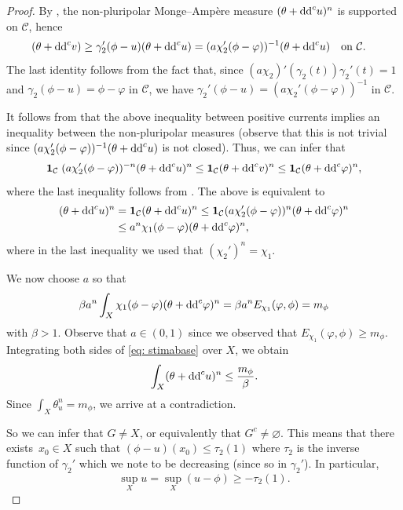 \documentclass[11pt]{article}
\numberwithin{equation}{section}
\numberwithin{equation}{section}
\theoremstyle{plain}
\newcommand{\f}{\varphi}
\begin{document}
\begin{proof}
By \cite[Theorem 2.7]{DDL6}, the non-pluripolar Monge--Amp\`ere measure $(\theta+{\rm dd}^c u)^n$ is supported on $\mathcal{C}$, hence
\begin{align*}%
	(\theta+{\rm dd}^c v) &\geq \gamma_2'(\phi-u) (\theta+{\rm dd}^c u)
		 = (a\chi_2'(\phi-\varphi))^{-1} (\theta+{\rm dd}^c u)\quad \text{on $\mathcal{C}$}.
\end{align*}
The last identity follows from the fact that, since $(a\chi_2)'(\gamma_2(t))\gamma_2'(t)=1$ and $\gamma_2(\phi-u)=\phi-\varphi$ in $\mathcal{C}$, we have $\gamma_2'(\phi-u)= (a\chi_2'(\phi-\varphi))^{-1}$ in $\mathcal{C}$.

It follows from \cite[Lemma 5.19]{DDL6} that the above inequality between positive currents implies an inequality between the non-pluripolar measures (observe that this is not trivial since $(a\chi_2'(\phi-\varphi))^{-1} (\theta+{\rm dd}^c u)$ is not closed).
Thus, we can infer that
\begin{equation*}
 {\bf 1}_{\mathcal{C}} \;(a\chi_2'(\phi-\varphi))^{-n} (\theta+{\rm dd}^c u)^n
	\leq {\bf 1}_{\mathcal{C}}(\theta+{\rm dd}^c v)^n \leq {\bf 1}_{\mathcal{C}}(\theta+{\rm dd}^c \varphi)^n,
\end{equation*}
where the last inequality follows from \cite[Lemma 4.5]{DDL5}. The above is equivalent to
\begin{align}
 (\theta+{\rm dd}^c u)^n &={\bf 1}_{ \mathcal{C}} (\theta+{\rm dd}^c u)^n \leq {\bf 1}_{ \mathcal{C}} (a\chi_2'(\phi-\varphi))^{n}(\theta+{\rm dd}^c \f)^n\nonumber\\
 &\leq a^n \chi_1(\phi-\varphi)(\theta+{\rm dd}^c \f)^n, \label{eq: stimabase}
\end{align}
where in the last inequality we used that $(\chi_2')^n=\chi_1$.

We now choose $a$ so that
\[
\beta a^n \int_X \chi_1(\phi-\varphi) (\theta+{\rm dd}^c \varphi)^n=\beta a^n E_{\chi_1}(\varphi, \phi) = m_\phi
\]
 with $\beta > 1$.
Observe that $a\in(0,1)$ since we observed that $E_{\chi_1}(\varphi, \phi)\geq m_\phi$.
Integrating both sides of \eqref{eq: stimabase} over $X$, we obtain
\[
\int_X (\theta+{\rm dd}^c u)^n \leq \frac{m_\phi}{\beta}.
\]
Since $\int_X \theta_u^n=m_\phi$, we arrive at a contradiction.

So we can infer that $G\neq X$, or equivalently that $G^c\neq \varnothing$. This means that there exists~${x_0\in X}$ such that $(\phi-u)(x_0)\leq \tau_2(1)$ where $\tau_2$ is the inverse function of $\gamma_2'$ which we note to be decreasing (since so in $\gamma_2'$). In particular,
\[\sup_X u =\sup_X (u-\phi) \geq -\tau_2(1).\]


\end{proof}
\end{document}
